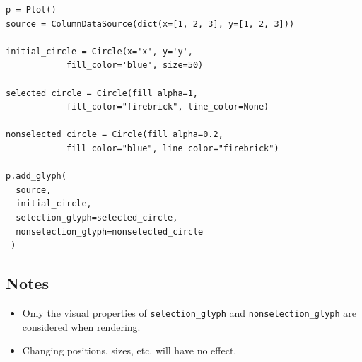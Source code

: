 \documentclass[a4paper,12pt]{article}
\begin{document}
\begin{framed}
	\begin{verbatim}p = Plot()
source = ColumnDataSource(dict(x=[1, 2, 3], y=[1, 2, 3]))

initial_circle = Circle(x='x', y='y', 
			fill_color='blue', size=50)
			
selected_circle = Circle(fill_alpha=1, 
			fill_color="firebrick", line_color=None)
			
nonselected_circle = Circle(fill_alpha=0.2, 
			fill_color="blue", line_color="firebrick")

p.add_glyph(
  source,
  initial_circle,
  selection_glyph=selected_circle,
  nonselection_glyph=nonselected_circle
 )
\end{verbatim}
\end{framed}
\subsection*{Notes}
\begin{itemize}
\item Only the visual properties of \texttt{selection\_glyph} and \texttt{nonselection\_glyph} are considered when rendering. 
\item Changing positions, sizes, etc. will have no effect.
\end{itemize}


\end{document}
